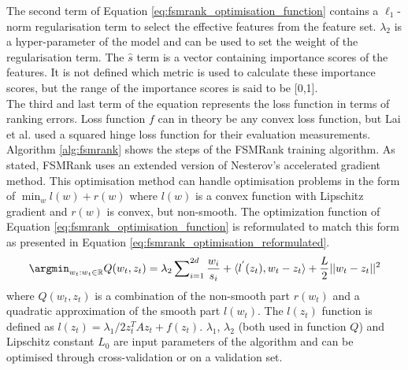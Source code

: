The second term of Equation \ref{eq:fsmrank_optimisation_function} contains a $\ell_1$-norm regularisation term to select the effective features from the feature set. $\lambda_2$ is a hyper-parameter of the model and can be used to set the weight of the regularisation term. The $\hat{s}$ term is a vector containing importance scores of the features. It is not defined which metric is used to calculate these importance scores, but the range of the importance scores is said to be [0,1].\\

The third and last term of the equation represents the loss function in terms of ranking errors. Loss function $f$ can in theory be any convex loss function, but Lai et al. \cite{Lai2013c} used a squared hinge loss function for their evaluation measurements.\\

Algorithm \ref{alg:fsmrank} shows the steps of the FSMRank training algorithm. As stated, FSMRank uses an  extended version of Nesterov's accelerated gradient method. This optimisation method can handle optimisation problems in the form of $\min_w l(w) + r(w)$ where $l(w)$ is a convex function with Lipschitz gradient and $r(w)$ is convex, but non-smooth. The optimization function of Equation \ref{eq:fsmrank_optimisation_function} is reformulated to match this form as presented in Equation \ref{eq:fsmrank_optimisation_reformulated}.
\begin{equation}
\argmin_{w_t:w_t\in \mathbb{R}} Q(w_t,z_t) = \lambda_2 \sum\nolimits_{i=1}^{2d}\frac{w_i}{s_i}+\langle l^{'}(z_t),w_t-z_t \rangle+\frac{L}{2}||w_t-z_t||^2
\label{eq:fsmrank_optimisation_reformulated}
\end{equation}
\noindent where $Q(w_t,z_t)$ is a combination of the non-smooth part $r(w_t)$ and a quadratic approximation of the smooth part $l(w_t)$. The $l(z_t)$ function is defined as $l(z_t) = \lambda_1 / 2z_t^{T}Az_t+f(z_t)$. $\lambda_1$, $\lambda_2$ (both used in function $Q$) and Lipschitz constant $L_0$ are input parameters of the algorithm and can be optimised through cross-validation or on a validation set.\\

